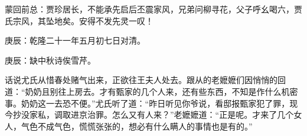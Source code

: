 \begin{parag}
    \begin{note}蒙回前总：贾珍居长，不能承先启后丕震家风，兄弟问柳寻花，父子呼幺喝六，贾氏宗风，其坠地矣。安得不发先灵一叹！\end{note}
\end{parag}


\begin{parag}
    \begin{note}庚辰：乾隆二十一年五月初七日对清。\end{note}
\end{parag}


\begin{parag}
    \begin{note}庚辰：缺中秋诗俟雪芹。\end{note}
\end{parag}


\begin{parag}
    话说尤氏从惜春处赌气出来，正欲往王夫人处去。跟从的老嬷嬷们因悄悄的回道：“奶奶且别往上房去。才有甄家的几个人来，还有些东西，不知是作什么机密事。奶奶这一去恐不便。”尤氏听了道：“昨日听见你爷说，看邸报甄家犯了罪，现今抄没家私，调取进京治罪。怎么又有人来？”老嬷嬷道：“正是呢。才来了几个女人，气色不成气色，慌慌张张的，想必有什么瞒人的事情也是有的。”
\end{parag}


